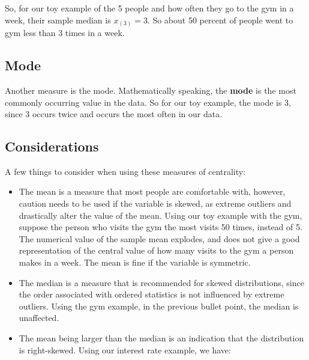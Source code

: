 \documentclass[
]{book}
\newenvironment{Shaded}{\begin{snugshade}}{\end{snugshade}}
\newcommand{\FunctionTok}[1]{\textcolor[rgb]{0.13,0.29,0.53}{\textbf{#1}}}
\newcommand{\NormalTok}[1]{#1}
\newcommand{\SpecialCharTok}[1]{\textcolor[rgb]{0.81,0.36,0.00}{\textbf{#1}}}
\begin{document}
So, for our toy example of the 5 people and how often they go to the gym in a week, their sample median is \(x_{(3)} = 3\). So about 50 percent of people went to gym less than 3 times in a week.

\subsection{Mode}\label{mode}

Another measure is the mode. Mathematically speaking, the \textbf{mode} is the most commonly occurring value in the data. So for our toy example, the mode is 3, since 3 occurs twice and occurs the most often in our data.

\subsection{Considerations}\label{considerations}

A few things to consider when using these measures of centrality:

\begin{itemize}
\item
  The mean is a measure that most people are comfortable with, however, caution needs to be used if the variable is skewed, as extreme outliers and drastically alter the value of the mean. Using our toy example with the gym, suppose the person who visits the gym the most visits 50 times, instead of 5. The numerical value of the sample mean explodes, and does not give a good representation of the central value of how many visits to the gym a person makes in a week. The mean is fine if the variable is symmetric.
\item
  The median is a measure that is recommended for skewed distributions, since the order associated with ordered statistics is not influenced by extreme outliers. Using the gym example, in the previous bullet point, the median is unaffected.
\item
  The mean being larger than the median is an indication that the distribution is right-skewed. Using our interest rate example, we have:
\end{itemize}

\begin{Shaded}
\end{Shaded}
\end{document}
